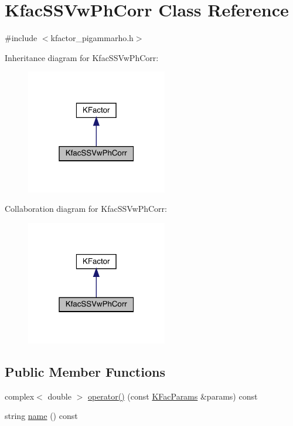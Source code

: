 \hypertarget{classKfacSSVwPhCorr}{}\section{Kfac\+S\+S\+Vw\+Ph\+Corr Class Reference}
\label{classKfacSSVwPhCorr}


{\ttfamily \#include $<$kfactor\+\_\+pigammarho.\+h$>$}



Inheritance diagram for Kfac\+S\+S\+Vw\+Ph\+Corr\+:
\nopagebreak
\begin{figure}[H]
\begin{center}
\leavevmode
\includegraphics[width=175pt]{d6/dff/classKfacSSVwPhCorr__inherit__graph}
\end{center}
\end{figure}


Collaboration diagram for Kfac\+S\+S\+Vw\+Ph\+Corr\+:
\nopagebreak
\begin{figure}[H]
\begin{center}
\leavevmode
\includegraphics[width=175pt]{de/da4/classKfacSSVwPhCorr__coll__graph}
\end{center}
\end{figure}
\subsection*{Public Member Functions}
\begin{DoxyCompactItemize}
\item 
complex$<$ double $>$ \mbox{\hyperlink{classKfacSSVwPhCorr_abe3adeddc111ac5016b07086242fd7f1}{operator()}} (const \mbox{\hyperlink{classKFacParams}{K\+Fac\+Params}} \&params) const
\item 
string \mbox{\hyperlink{classKfacSSVwPhCorr_a8f314b4585a7d3a9b17795cad0682309}{name}} () const
\end{DoxyCompactItemize}



